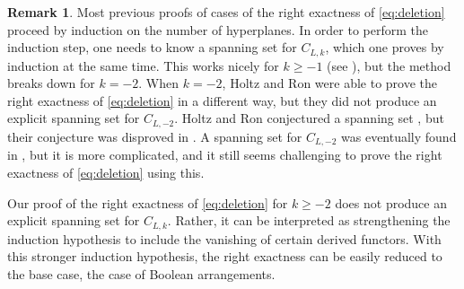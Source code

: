 \documentclass{amsart}
\theoremstyle{definition}
\newtheorem{remark}[theorem]{Remark}
\begin{document}
\begin{remark}
Most previous proofs of cases of the right exactness of \eqref{eq:deletion} \cite{DM,PSS,ArdilaPostnikov,HoltzRon,BergetTutte, Superspace} proceed by induction on the number of hyperplanes. In order to perform the induction step, one needs to know a spanning set for $C_{L, k}$, which one proves by induction at the same time. This works nicely for $k \ge -1$ (see \cite[Proposition 4.4 and 4.5]{ArdilaPostnikov}), but the method breaks down for $k = -2$. When $k=-2$, Holtz and Ron were able to prove the right exactness of \eqref{eq:deletion} in a different way, but they did not produce an explicit spanning set for $C_{L, -2}$. Holtz and Ron conjectured a spanning set \cite[Conjecture 6.1]{HoltzRon}, but their conjecture was disproved in \cite[Proposition 2]{APCorrection}. A spanning set for $C_{L, -2}$ was eventually found in \cite[Section 4.5]{GillespieThesis}, but it is more complicated, and it still seems challenging to prove the right exactness of \eqref{eq:deletion} using this. 

Our proof of the right exactness of \eqref{eq:deletion} for $k \ge -2$ does not produce an explicit spanning set for $C_{L, k}$. Rather, it can be interpreted as strengthening the induction hypothesis to include the vanishing of certain derived functors. With this stronger induction hypothesis, the right exactness can be easily reduced to the base case, the case of Boolean arrangements. 
\end{remark}
\end{document}
